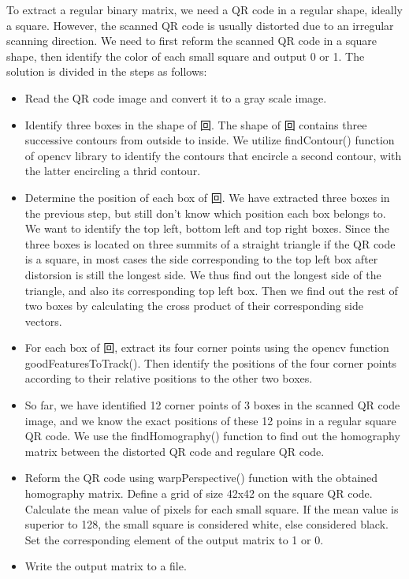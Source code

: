 \documentclass[10pt]{article}
\begin{document}
To extract a regular binary matrix, we need a QR code in a regular shape, ideally a square. However,
the scanned QR code is usually distorted due to an irregular scanning direction. We need to first 
reform the scanned QR code in a square shape, then identify the color of each small 
square and output 0 or 1. The solution is divided in the steps as follows: \\
\begin{itemize}

\item Read the QR code image and convert it to a gray scale image.

\item Identify three boxes in the shape of 回. The shape of 回 contains three successive contours
from outside to inside. We utilize findContour() function of opencv library to identify
the contours that encircle a second contour, with the latter encircling a thrid contour. 

\item Determine the position of each box of 回. We have extracted three boxes in the previous step, but
still don't know which position each box belongs to. We want to identify the top left, bottom left 
and top right boxes. Since the three boxes is located on three 
summits of a straight triangle if the QR code is a square, in most cases the side corresponding
to the top left box after distorsion is still the longest side. We thus find out the longest side
of the triangle, and also its corresponding top left box. Then we find out the rest of two boxes 
by calculating the cross product of their corresponding side vectors.

\item For each box of 回, extract its four corner points using the opencv function goodFeaturesToTrack().
Then identify the positions of the four corner points according to their relative positions 
to the other two boxes.

\item So far, we have identified 12 corner points of 3 boxes in the scanned QR code image, and we
 know the exact positions of these 12 poins in a regular square QR code. We use the findHomography()
 function to find out the homography matrix between the distorted QR code and regulare QR code.

\item Reform the QR code using warpPerspective() function with the obtained homography matrix. Define 
a grid of size 42x42 on the square QR code. Calculate the mean value of pixels for each small square.
If the mean value is superior to 128, the small square is considered white, else considered black.
Set the corresponding element of the output matrix to 1 or 0.

\item Write the output matrix to a file.


\end{itemize}
\end{document}
